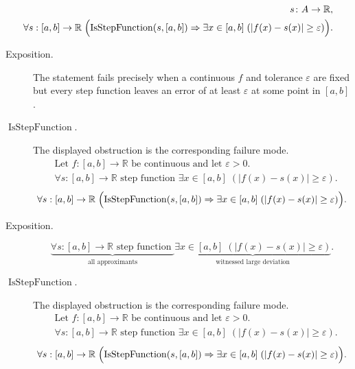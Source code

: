 \begin{remark*}
\[
\begin{aligned}
  s\colon A\to\mathbb{R},\\
\forall s:[a,b]\to\mathbb{R}\;
\Bigl(\operatorname{IsStepFunction}(s,[a,b]) \Rightarrow
\exists x\in[a,b]\;(|f(x)-s(x)|\ge\varepsilon)\Bigr).
\end{aligned}
\]
\end{remark*}

\begin{remark*}
\begin{description}
  \item[Exposition.]
The statement fails precisely when a continuous $f$ and tolerance $\varepsilon$ are fixed but every step function leaves an error of at least $\varepsilon$ at some point in $[a,b]$.


  \item[\(\operatorname{IsStepFunction}.\)]
  The displayed obstruction is the corresponding failure mode.
  \[
\begin{aligned}
&\text{Let } f:[a,b]\to\mathbb{R} \text{ be continuous and let } \varepsilon>0.\\
&\forall s:[a,b]\to\mathbb{R} \text{ step function } \exists x\in[a,b]\;(|f(x)-s(x)|\ge\varepsilon).
\end{aligned}
  \]
  \[
\forall s:[a,b]\to\mathbb{R}\;
\Bigl(\operatorname{IsStepFunction}(s,[a,b]) \Rightarrow
\exists x\in[a,b]\;(|f(x)-s(x)|\ge\varepsilon)\Bigr).
  \]
\end{description}
\end{remark*}

\begin{remark*}
\begin{description}
  \item[Exposition.]
\[
\underbrace{\forall s:[a,b]\to\mathbb{R} \text{ step function }}_{\text{all approximants}}
\underbrace{\exists x\in[a,b]\;(|f(x)-s(x)|\ge\varepsilon)}_{\text{witnessed large deviation}}.
\]


  \item[\(\operatorname{IsStepFunction}.\)]
  The displayed obstruction is the corresponding failure mode.
  \[
\begin{aligned}
&\text{Let } f:[a,b]\to\mathbb{R} \text{ be continuous and let } \varepsilon>0.\\
&\forall s:[a,b]\to\mathbb{R} \text{ step function } \exists x\in[a,b]\;(|f(x)-s(x)|\ge\varepsilon).
\end{aligned}
  \]
  \[
\forall s:[a,b]\to\mathbb{R}\;
\Bigl(\operatorname{IsStepFunction}(s,[a,b]) \Rightarrow
\exists x\in[a,b]\;(|f(x)-s(x)|\ge\varepsilon)\Bigr).
  \]
\end{description}
\end{remark*}

